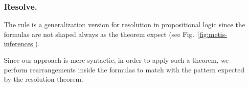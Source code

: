 \documentclass[../main.tex]{subfiles}
\begin{document}
\subsubsection{Resolve.} The \resolve rule is a generalization version for resolution in propositional logic since the formulas are not shaped always as the theorem expect (see Fig.~\ref{fig:metis-inferences}).

Since our approach is mere syntactic, in order to apply such a
theorem, we perform rearrangements inside the formulas to match with
the pattern expected by the resolution theorem.

\begin{lemma}

\end{lemma}
\end{document}
